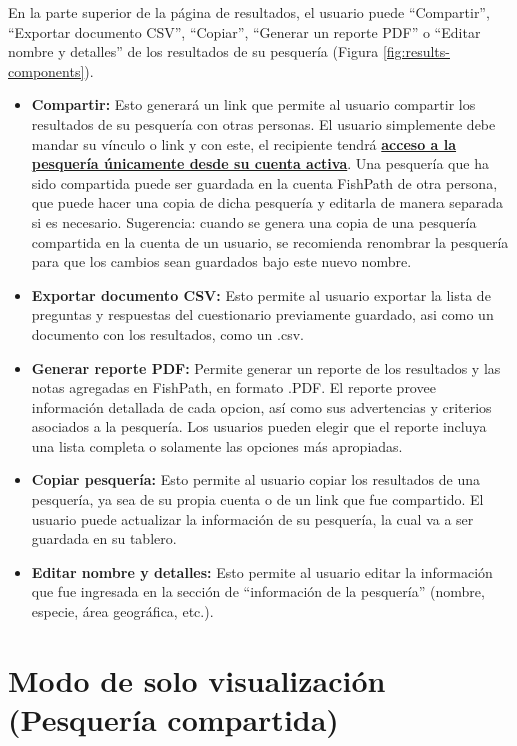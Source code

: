 \documentclass[
  11pt,
]{book}
\providecommand{\tightlist}{%
  \setlength{\itemsep}{0pt}\setlength{\parskip}{0pt}}
\begin{document}
En la parte superior de la página de resultados, el usuario puede ``Compartir'', ``Exportar documento CSV'', ``Copiar'', ``Generar un reporte PDF'' o ``Editar nombre y detalles'' de los resultados de su pesquería (Figura \ref{fig:results-components}).

\begin{itemize}
\tightlist
\item
  \textbf{Compartir:} Esto generará un link que permite al usuario compartir los resultados de su pesquería con otras personas. El usuario simplemente debe mandar su vínculo o link y con este, el recipiente tendrá \protect\hyperlink{View-Only}{\textbf{acceso a la pesquería únicamente desde su cuenta activa}}. Una pesquería que ha sido compartida puede ser guardada en la cuenta FishPath de otra persona, que puede hacer una copia de dicha pesquería y editarla de manera separada si es necesario. Sugerencia: cuando se genera una copia de una pesquería compartida en la cuenta de un usuario, se recomienda renombrar la pesquería para que los cambios sean guardados bajo este nuevo nombre.
\item
  \textbf{Exportar documento CSV:} Esto permite al usuario exportar la lista de preguntas y respuestas del cuestionario previamente guardado, asi como un documento con los resultados, como un .csv.
\item
  \textbf{Generar reporte PDF:} Permite generar un reporte de los resultados y las notas agregadas en FishPath, en formato .PDF. El reporte provee información detallada de cada opcion, así como sus advertencias y criterios asociados a la pesquería. Los usuarios pueden elegir que el reporte incluya una lista completa o solamente las opciones más apropiadas.
\item
  \textbf{Copiar pesquería:} Esto permite al usuario copiar los resultados de una pesquería, ya sea de su propia cuenta o de un link que fue compartido. El usuario puede actualizar la información de su pesquería, la cual va a ser guardada en su tablero.
\item
  \textbf{Editar nombre y detalles:} Esto permite al usuario editar la información que fue ingresada en la sección de ``información de la pesquería'' (nombre, especie, área geográfica, etc.).
\end{itemize}

\hypertarget{View-Only}{%
\section{Modo de solo visualización (Pesquería compartida)}\label{View-Only}}
\end{document}
